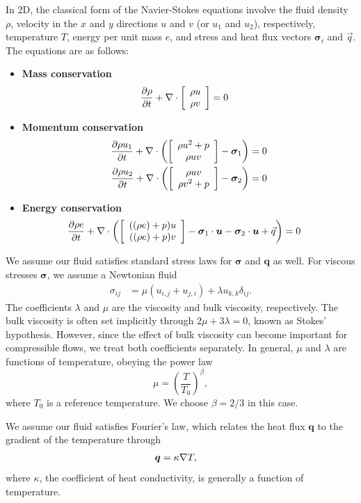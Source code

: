 In 2D, the classical form of the Navier-Stokes equations involve the fluid density $\rho$, velocity in the $x$ and $y$ directions $u$ and $v$ (or $u_1$ and $u_2$), respectively, temperature $T$, energy per unit mass $e$, and stress and heat flux vectors $\boldsymbol \sigma_i$ and $\vec{q}$. The equations are as follows:
\begin{itemize}
\item{\textbf{Mass conservation}}
\begin{align*}
\pd{\rho}{t} + \div \vecttwo{\rho u }{\rho v} &= 0
\end{align*}

\item{\textbf{Momentum conservation}}
\begin{align*}
\pd{\rho u_1}{t} + \div \left(\vecttwo{\rho u^2+p }{\rho u v} - \boldsymbol \sigma_{1}\right) &=0\\
\pd{\rho u_2}{t} + \div \left(\vecttwo{\rho u v}{\rho v^2+p } - \boldsymbol \sigma_{2}\right) &=0
\end{align*}

\item{\textbf{Energy conservation}}
\begin{align*}
\pd{\rho e}{t} + \div \left(\vecttwo{((\rho e)+p)u}{((\rho e)+p)v} - \boldsymbol \sigma_1 \cdot \boldsymbol u- \boldsymbol \sigma_2 \cdot \boldsymbol u + \vec{q}\right) &=0
\end{align*}
\end{itemize}

We assume our fluid satisfies standard stress laws for $\boldsymbol \sigma$ and $\boldsymbol q$ as well. For viscous stresses $\boldsymbol \sigma$, we assume a Newtonian fluid
\begin{align*}
\sigma_{ij} &= \mu(u_{i,j}+u_{j,i}) + \lambda u_{k,k}\delta_{ij}.
\end{align*}
The coefficients $\lambda$ and $\mu$ are the viscosity and bulk viscosity, respectively. The bulk viscosity is often set implicitly through $2\mu + 3\lambda = 0$, known as Stokes' hypothesis. However, since the effect of bulk viscosity can become important for compressible flows, we treat both coefficients separately. In general, $\mu$ and $\lambda$ are functions of temperature, obeying the power law
\[
\mu = \left(\frac{T}{T_0}\right)^\beta,
\]
where $T_0$ is a reference temperature. We choose $\beta = 2/3$ in this case. 

We assume our fluid satisfies Fourier's law, which relates the heat flux $\boldsymbol q$ to the gradient of the temperature through
\begin{align*}
{\boldsymbol q} &= \kappa \grad T,
\end{align*}
where $\kappa$, the coefficient of heat conductivity, is generally a function of temperature. 

